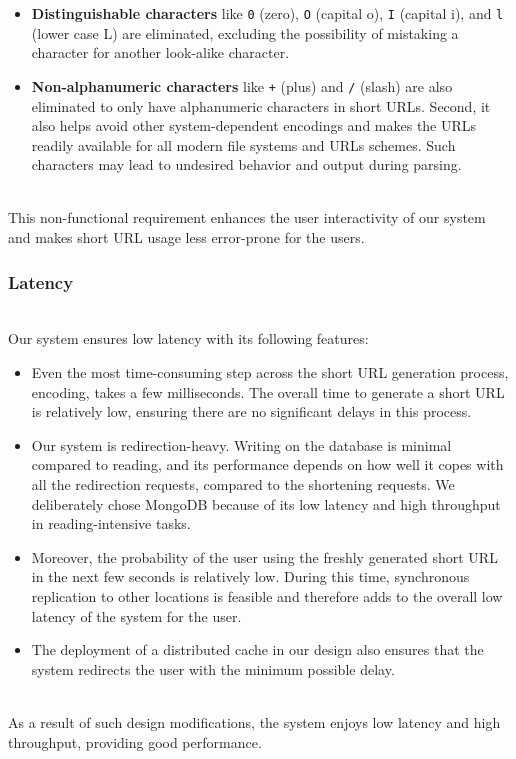 \begin{itemize}
\item
\protect{}\label{lY3_g_ZD6Xkd9E3OvhVeh}
\textbf{Distinguishable characters} like \texttt{0} (zero), \texttt{O} (capital o), \texttt{I} (capital i), and \texttt{l} (lower case L) are eliminated, excluding the possibility of mistaking a character for another look-alike character.
\item
\protect{}\label{mP2OvH35iR0Np307nyqhj}
\textbf{Non-alphanumeric characters} like \texttt{+} (plus) and \texttt{/} (slash) are also eliminated to only have alphanumeric characters in short URLs. Second, it also helps avoid other system-dependent encodings and makes the URLs readily available for all modern file systems and URLs schemes. Such characters may lead to undesired behavior and output during parsing.
\end{itemize}
\\
This non-functional requirement enhances the user interactivity of our system and makes short URL usage less error-prone for the users.

\subsubsection{Latency}\label{nmMIMPp46gB0fKAe_MWaX}
\\
Our system ensures low latency with its following features:

\begin{itemize}
\item
\protect{}\label{9oT7nHnsitERO82LPEB-J}
Even the most time-consuming step across the short URL generation process, encoding, takes a few milliseconds. The overall time to generate a short URL is relatively low, ensuring there are no significant delays in this process.
\item
\protect{}\label{w6_FEhjybFkANZkEU9arO}
Our system is redirection-heavy. Writing on the database is minimal compared to reading, and its performance depends on how well it copes with all the redirection requests, compared to the shortening requests. We deliberately chose MongoDB because of its low latency and high throughput in reading-intensive tasks.
\item
\protect{}\label{nljf8ffrY6uz3sVyqEH3c}
Moreover, the probability of the user using the freshly generated short URL in the next few seconds is relatively low. During this time, synchronous replication to other locations is feasible and therefore adds to the overall low latency of the system for the user.
\item
\protect{}\label{W6PfM3fQeCIt4VQxjGe2i}
The deployment of a distributed cache in our design also ensures that the system redirects the user with the minimum possible delay.
\end{itemize}
\\
As a result of such design modifications, the system enjoys low latency and high throughput, providing good performance.

